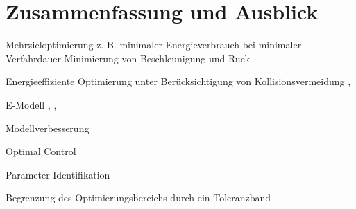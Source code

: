 \chapter{Zusammenfassung und Ausblick}

Mehrzieloptimierung z. B. minimaler Energieverbrauch bei minimaler Verfahrdauer \cite{Lin.2018} Minimierung von Beschleunigung und Ruck  \cite{Saravanan.2008}

Energieeffiziente Optimierung unter Berücksichtigung von Kollisionsvermeidung  \cite{Bjorkenstam.2013}, \cite{Gleeson.2015}

E-Modell \cite{Pellicciari.2011}, \cite[S.~1]{Hansen.2012}, \cite{Ziaukas.2017}

Modellverbesserung  \cite{Paryanto.2015}

Optimal Control \cite{Bjorkenstam.2013}

Parameter Identifikation  \cite{Gattringer.2013}

Begrenzung des Optimierungsbereichs durch ein Toleranzband \cite[S.~55]{Eggers.2019}